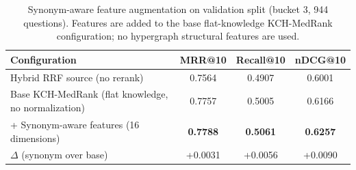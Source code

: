 \begin{table}[t]
\centering
\small
\caption{Synonym-aware feature augmentation on validation split (bucket 3, 944 questions). Features are added to the base flat-knowledge KCH-MedRank configuration; no hypergraph structural features are used.}
\label{tab:normalization-ablation}
\begin{tabular}{lccc}
\toprule
Configuration & MRR@10 & Recall@10 & nDCG@10 \\
\midrule
Hybrid RRF source (no rerank) & 0.7564 & 0.4907 & 0.6001 \\
Base KCH-MedRank (flat knowledge, no normalization) & 0.7757 & 0.5005 & 0.6166 \\
\hspace{6pt} + Synonym-aware features (16 dimensions) & \textbf{0.7788} & \textbf{0.5061} & \textbf{0.6257} \\
\midrule
$\Delta$ (synonym over base) & +0.0031 & +0.0056 & +0.0090 \\
\bottomrule
\end{tabular}
\end{table}
